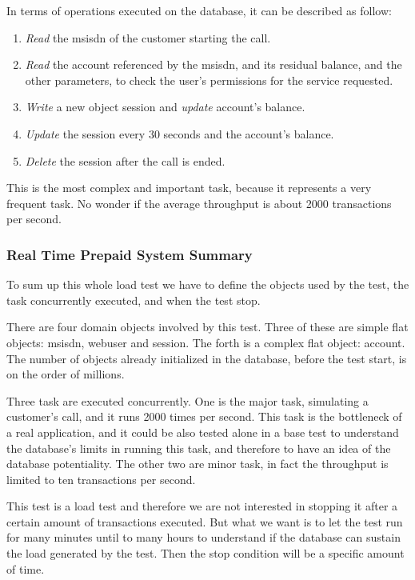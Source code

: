 In terms of operations executed on the database, it can be described as follow:
\begin{enumerate}
	\item \emph{Read} the msisdn of the customer starting the call.
	\item \emph{Read} the account referenced by the msisdn, and its residual balance, and the other parameters, to check the user's permissions for the service requested.
	\item \emph{Write} a new object session and \emph{update} account's balance.
	\item \emph{Update} the session every 30 seconds and the account's balance.
	\item \emph{Delete} the session after the call is ended.
\end{enumerate}

This is the most complex and important task, because it represents a very frequent task. No wonder if the average throughput is about 2000 transactions per second.

			\subsubsection{Real Time Prepaid System Summary}
To sum up this whole load test we have to define the objects used by the test, the task concurrently executed, and when the test stop.

There are four domain objects involved by this test. Three of these are simple flat objects: msisdn, webuser and session. The forth is a complex flat object: account. The number of objects already initialized in the database, before the test start, is on the order of millions.

Three task are executed concurrently. One is the major task, simulating a customer's call, and it runs 2000 times per second. This task is the bottleneck of a real application, and it could be also tested alone in a base test to understand the database's limits in running this task, and therefore to have an idea of the database potentiality. The other two are minor task, in fact the throughput is limited to ten transactions per second.

This test is a load test and therefore we are not interested in stopping it after a certain amount of transactions executed. But what we want is to let the test run for many minutes until to many hours to understand if the database can sustain the load generated by the test. Then the stop condition will be a specific amount of time.
			
